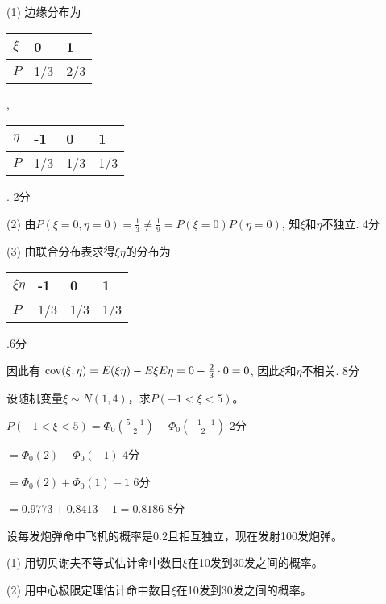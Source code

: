 \documentclass[noanswer]{USTBExam}
\begin{document}
\begin{solution}
  (1) 边缘分布为
  \begin{tabular}{|l|l|l|}
    \hline
    $\xi$ & 0   & 1   \\
    \hline
    $P$   & 1/3 & 2/3 \\
    \hline
  \end{tabular}
  , \
  \begin{tabular}{|l|l|l|l|}
    \hline
    $\eta$ & -1  & 0   & 1   \\
    \hline
    $P$    & 1/3 & 1/3 & 1/3 \\
    \hline
  \end{tabular}
  . \dotfill 2分 \par
    (2) 由$P(\xi = 0, \eta = 0) = \frac{1}{3} \neq \frac{1}{9} = P(\xi = 0) P(\eta = 0)$,
  知$\xi$和$\eta$不独立. \dotfill 4分 \par
    (3) 由联合分布表求得$\xi \eta$的分布为
  \begin{tabular}{|l|l|l|l|}
    \hline
    $\xi \eta$ & -1  & 0   & 1   \\
    \hline
    $P$        & 1/3 & 1/3 & 1/3 \\
    \hline
  \end{tabular}
  .\dotfill 6分\par
  因此有 $\operatorname{\operatorname{cov}}(\xi, \eta) = E(\xi\eta) - E\xi E\eta = 0 -\frac{2}{3} \cdot 0 = 0$,
  因此$\xi$和$\eta$不相关. \dotfill 8分
\end{solution}


\begin{problem}
  设随机变量$\xi \sim N (1, 4)$，求$P (- 1 < \xi < 5)$。
\end{problem}

\bigskip

\begin{solution}
  $P(-1<\xi<5) = \Phi_0\left(\frac{5-1}{2}\right) - \Phi_0\left(\frac{-1-1}{2}\right)$ \dotfill 2分 \par
  \qquad $= \Phi_0 (2) - \Phi_0 (- 1)$ \dotfill 4分 \par
  \qquad $= \Phi_0 (2) + \Phi_0 (1) - 1$ \dotfill 6分 \par
  \qquad $= 0.9773 + 0.8413 - 1 = 0.8186$ \dotfill 8分
\end{solution}



\begin{problem}
  设每发炮弹命中飞机的概率是0.2且相互独立，现在发射100发炮弹。\par
  (1) 用切贝谢夫不等式估计命中数目$\xi$在10发到30发之间的概率。\par
  (2) 用中心极限定理估计命中数目$\xi$在10发到30发之间的概率。
\end{problem}
\end{document}
